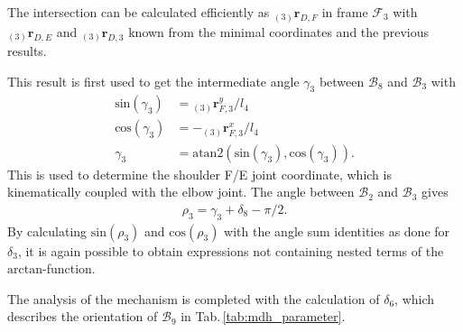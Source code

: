 \documentclass[letterpaper, 10 pt, conference]{ieeeconf}  %
\newcommand{\body}[1]{\mathcal{B}_{#1}}
\newcommand{\ks}[1]{\mathcal{F}_{#1}}
\newcommand{\ortvek}[3]{{ }_{(#1)}{\boldsymbol{r}}^{#2}_{#3}}
\begin{document}
The intersection can be calculated efficiently as $\ortvek{3}{}{D,F}$ in frame $\ks{3}$ with $\ortvek{3}{}{D,E}$ and $\ortvek{3}{}{D,3}$ known from the minimal coordinates and the previous results.

This result is first used to get the intermediate angle $\gamma_3$ between $\body{8}$ and $\body{3}$ with
%
\begin{align}
\mathrm{sin}(\gamma_3) &= \ortvek{3}{y}{F,3} / l_{4} \\
\mathrm{cos}(\gamma_3) &= -\ortvek{3}{x}{F,3} / l_{4} \\
\gamma_3 &= \mathrm{atan2}(\mathrm{sin}(\gamma_3), \mathrm{cos}(\gamma_3)).
\end{align}
%
This is used to determine the shoulder F/E joint coordinate, which is kinematically coupled with the elbow joint.
The angle between $\body{2}$ and $\body{3}$ gives
%
\begin{align}
\rho_3 = \gamma_3 + \delta_8 - \pi/2.
\label{equ:rho3_explicit}
\end{align}
%
By calculating $\mathrm{sin}(\rho_3)$ and $\mathrm{cos}(\rho_3)$ with the angle sum identities as done for $\delta_3$, it is again possible to obtain expressions not containing nested terms of the $\mathrm{arctan}$-function.

The analysis of the mechanism is completed with the calculation of $\delta_6$, which describes the orientation of $\body{9}$ in Tab.\,\ref{tab:mdh_parameter}.
\end{document}
